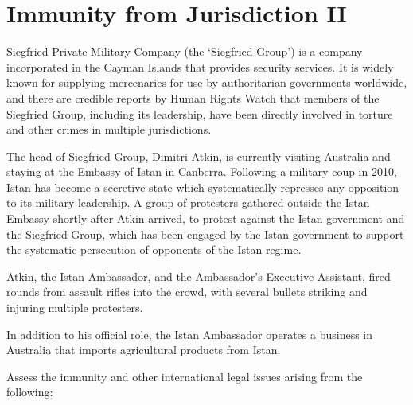 \section{Immunity from Jurisdiction II}
\begin{tutorialquestion}
    \flushleft
    Siegfried Private Military Company (the `Siegfried Group') is a company incorporated in the Cayman Islands that provides security services. It is widely known for supplying mercenaries for use by authoritarian governments worldwide, and there are credible reports by Human Rights Watch that members of the Siegfried Group, including its leadership, have been directly involved in torture and other crimes in multiple jurisdictions.

    \vspace{\baselineskip}

    The head of Siegfried Group, Dimitri Atkin, is currently visiting Australia and staying at the Embassy of Istan in Canberra. Following a military coup in 2010, Istan has become a secretive state which systematically represses any opposition to its military leadership. A group of protesters gathered outside the Istan Embassy shortly after Atkin arrived, to protest against the Istan government and the Siegfried Group, which has been engaged by the Istan government to support the systematic persecution of opponents of the Istan regime.
    
    \vspace{\baselineskip}
    
    Atkin, the Istan Ambassador, and the Ambassador's Executive Assistant, fired rounds from assault rifles into the crowd, with several bullets striking and injuring multiple protesters.

    \vspace{\baselineskip}

    In addition to his official role, the Istan Ambassador operates a business in Australia that imports agricultural products from Istan.

    \vspace{\baselineskip}

    Assess the immunity and other international legal issues arising from the following:


\end{tutorialquestion}
